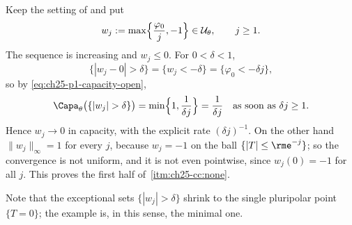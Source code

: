 \begin{example}
\label{ex:ch25-capacity-not-uniform}
Keep the setting of  and put
\[
 w_j:=\max\Bigl\{\frac{\varphi_0}{j},-1\Bigr\}\in\mathcal U_\theta,
 \qquad j\geq1 .
\]
The sequence is increasing and \(w_j\leq0\).  For \(0<\delta<1\),
\[
 \{|w_j-0|>\delta\}=\{w_j<-\delta\}=\{\varphi_0<-\delta j\},
\]
so by \eqref{eq:ch25-p1-capacity-open},
\[
 \Capa_\theta\bigl(\{|w_j|>\delta\}\bigr)
 =\min\Bigl\{1,\frac1{\delta j}\Bigr\}
 =\frac1{\delta j}\quad\text{as soon as }\delta j\geq1 .
\]
Hence \(w_j\to0\) in capacity, with the explicit rate
\((\delta j)^{-1}\).  On the other hand \(\|w_j\|_\infty=1\) for every
\(j\), because \(w_j=-1\) on the ball \(\{|T|\leq\rme^{-j}\}\); so the
convergence is not uniform, and it is not even pointwise, since
\(w_j(0)=-1\) for all \(j\).  This proves the first half of
\,\cref{itm:ch25-cc:none}.

Note that the exceptional sets \(\{|w_j|>\delta\}\) shrink to the single
pluripolar point \(\{T=0\}\); the example is, in this sense, the minimal one.
\end{example}

